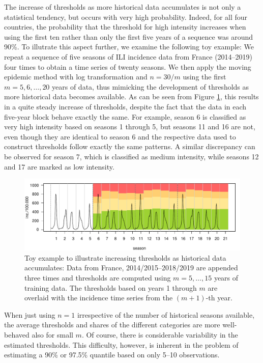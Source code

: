 \documentclass{article}
\begin{document}
The increase of thresholds as more historical data accumulates is not only a statistical tendency, but occurs with very high probability. Indeed, for all four countries, the probability that the threshold for high intensity increases when using the first ten rather than only the first five years of a sequence was around 90\%. To illutrate this aspect further, we examine the following toy example: We repeat a sequence of five seasons of ILI incidence data from France (2014--2019) four times to obtain a time series of twenty seasons. We then apply the moving epidemic method with log transformation and $n = 30/m$ using the first $m = 5, 6, \dots, 20$ years of data, thus mimicking the development of thresholds as more historical data becomes available. As can be seen from Figure \ref{fig:example_france}, this results in a quite steady increase of thresholds, despite the fact that the data in each five-year block behave exactly the same. For example, season 6 is classified as very high intensity based on seasons 1 through 5, but seasons 11 and 16 are not, even though they are identical to season 6 and the respective data used to construct thresholds follow exactly the same patterns. A similar discrepancy can be observed for season 7, which is classified as medium intensity, while seasons 12 and 17 are marked as low intensity.

\begin{figure}
\center
\includegraphics[scale=0.6]{figure/example_france.pdf}
\caption{Toy example to illustrate increasing thresholds as historical data accumulates: Data from France, 2014/2015--2018/2019 are appended three times and thresholds are computed using $m = 5, \dots, 15$ years of training data. The thresholds based on years 1 through $m$ are overlaid with the incidence time series from the $(m + 1)$-th year.}
\label{fig:example_france}
\end{figure}

When just using $n = 1$ irrespective of the number of historical seasons available, the average thresholds and shares of the different categories are more well-behaved also for small $m$. Of course, there is considerable variability in the estimated thresholds. This difficulty, however, is inherent in the problem of estimating a 90\% or 97.5\% quantile based on only 5--10 observations.
\end{document}
